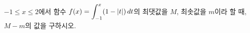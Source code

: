 $-1\le x\le 2$에서 함수 $f(x)=\displaystyle\int_{-1}^{x}(1-|t|)\mkern3mu dt$의 최댓값을 $M$, 최솟값을 $m$이라 할 때, $M-m$의 값을 구하시오.
